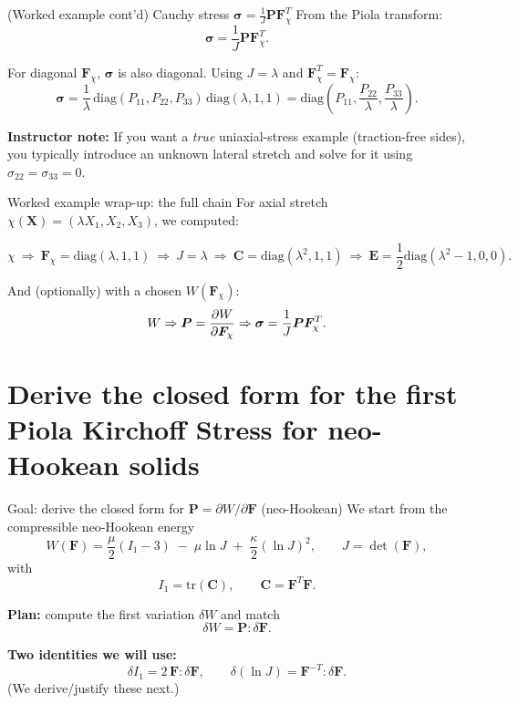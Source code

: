 \documentclass[aspectratio=169]{beamer}
\newcommand{\X}{\bm{X}}
\newcommand{\Cten}{\bm{C}}     %
\newcommand{\Eten}{\bm{E}}     %
\newcommand{\sigmaC}{\bm{\sigma}} %
\newcommand{\Fdef}{\bm{F}_{\chi}}  %
\newcommand{\Pten}{\bm{P}}         %
\begin{document}
\begin{frame}{(Worked example cont'd) Cauchy stress \(\sigmaC = \frac{1}{J}\Pten \Fdef^{T}\)}
\small
From the Piola transform:
\[
\sigmaC = \frac{1}{J}\Pten \Fdef^T.
\]

For diagonal \(\Fdef\), \(\sigmaC\) is also diagonal. Using \(J=\lambda\) and \(\Fdef^T=\Fdef\):
\[
\sigmaC
=
\frac{1}{\lambda}\,
\mathrm{diag}(P_{11},P_{22},P_{33})\,
\mathrm{diag}(\lambda,1,1)
=
\mathrm{diag}\left(P_{11},\frac{P_{22}}{\lambda},\frac{P_{33}}{\lambda}\right).
\]



\medskip
\textbf{Instructor note:} If you want a \emph{true} uniaxial-stress example (traction-free sides),
you typically introduce an unknown lateral stretch and solve for it using \(\sigma_{22}=\sigma_{33}=0\).
\end{frame}

\begin{frame}{Worked example wrap-up: the full chain}
\small
For axial stretch \(\chi(\X)=(\lambda X_1,X_2,X_3)\), we computed:

\medskip
\[
\chi \ \Rightarrow \
\Fdef=\mathrm{diag}(\lambda,1,1)
\ \Rightarrow\
J=\lambda
\ \Rightarrow\
\Cten=\mathrm{diag}(\lambda^2,1,1)
\ \Rightarrow\
\Eten=\frac12\mathrm{diag}(\lambda^2-1,0,0).
\]

\medskip
And (optionally) with a chosen \(W(\Fdef)\):
\[
W \Rightarrow \Pten=\pdv{W}{\Fdef} \Rightarrow \sigmaC=\frac{1}{J}\Pten\Fdef^T.
\]


\end{frame}

\section{Derive the closed form for the first Piola Kirchoff Stress for neo-Hookean solids}
\begin{frame}{Goal: derive the closed form for $\bm{P}=\partial W/\partial \bm{F}$ (neo-Hookean)}
\small
We start from the compressible neo-Hookean energy
\[
W(\bm{F})
=\frac{\mu}{2}(I_1-3)\;-\;\mu\ln J\;+\;\frac{\kappa}{2}(\ln J)^2,
\qquad
J=\det(\bm{F}),
\]
with
\[
I_1 = \mathrm{tr}(\bm{C}), \qquad \bm{C}=\bm{F}^T\bm{F}.
\]

\medskip
\textbf{Plan:} compute the first variation \(\delta W\) and match
\[
\delta W = \bm{P} : \delta\bm{F}.
\]

\medskip
\textbf{Two identities we will use:}
\[
\delta I_1 = 2\,\bm{F}:\delta\bm{F},
\qquad
\delta(\ln J) = \bm{F}^{-T}:\delta\bm{F}.
\]
(We derive/justify these next.)
\end{frame}
\end{document}
